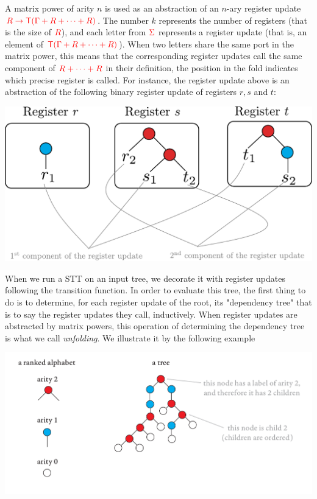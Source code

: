 A matrix power of arity $n$ is used as an abstraction of an $n$-ary register update ${\color{red}{R\to {\color{red}{\mathsf T}}(\Gamma+R+\dots+R)}}$. The number $k$ represents the number of registers (that is the size of ${\color{red}{R}}$), and each letter from ${\color{red}{\Sigma}}$ represents a register update (that is, an element of ${\color{red}{{\color{red}{\mathsf T}}(\Gamma+R+\dots+R)}}$). When two letters share the same port in the matrix power, this means that the corresponding register updates call the same component of ${\color{red}{R+\dots+R}}$ in their definition, the position in the fold indicates which precise register is called. For instance, the register update above is an abstraction of the following binary register update of registers $r, s$ and $t$:
   \begin{center}
   \includegraphics[scale=.34]{register-update-matrix-power.pdf}
   \end{center}
When we run a STT on an input tree, we decorate it with register updates following the transition function. In order to evaluate this tree, the first thing to do is to determine, for each register update of the root, its "dependency tree" that is to say the register updates they call, inductively. When register updates are abstracted by matrix powers, this operation of determining the dependency tree is what we call \emph{unfolding}. We illustrate it by the following example 
\begin{center}
\includegraphics[scale=.28, page=39]{pics.pdf}
\end{center}
